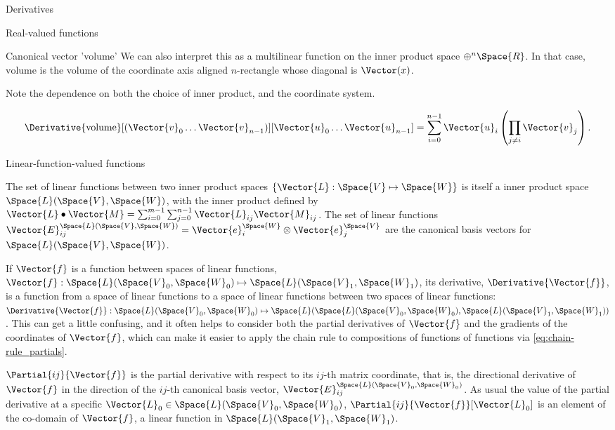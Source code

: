 \begin{plSection}{Derivatives}
\begin{plSection}{Real-valued functions}
\begin{plSection}{Canonical vector 'volume'}
We can also interpret this as a multilinear function on the
inner product space
$\oplus^{n} \Space{R}$.
In that case, $\text{volume}$ is the volume of the coordinate axis aligned
$n$-rectangle whose diagonal is $\Vector(x)$.

Note the dependence on both the choice of inner product, 
and the coordinate system.

\begin{equation}
\Derivative{\text{volume}}[(\Vector{v}_0 \ldots \Vector{v}_{n-1})][\Vector{u}_0 \ldots \Vector{u}_{n-1}]
 =  \sum_{i=0}^{n-1} \Vector{u}_i \left( \prod_{j \neq i} \Vector{v}_j \right).
\end{equation}

\end{plSection}%
\end{plSection}%
\begin{plSection}{Linear-function-valued functions}
\label{sec:Derivatives-of-linear-function-valued-functions}

The set of linear functions between two inner product spaces
$\left\{ \Vector{L} : \Space{V} \mapsto \Space{W} \right\}$
is itself a inner product space $\Space{L}(\Space{V},\Space{W})$,
with the inner product defined by
$\Vector{L} \bullet \Vector{M} = \sum_{i=0}^{m-1} \sum_{j=0}^{n-1} \Vector{L}_{ij} \Vector{M}_{ij}$.
The set of linear functions
$\Vector{E}_{ij}^{\Space{L}(\Space{V},\Space{W})}  = \Vector{e}_i^{\Space{W}} \otimes \Vector{e}_j^{\Space{V}}$
are the canonical basis vectors for $\Space{L}(\Space{V},\Space{W})$.

If $\Vector{f}$ is a function between spaces of linear functions,
$\Vector{f} : \Space{L}(\Space{V}_0,\Space{W}_0) \mapsto \Space{L}(\Space{V}_1,\Space{W}_1)$,
its derivative, $\Derivative{\Vector{f}}$,
is a function from a space of linear functions
to a space of linear functions between two
spaces of linear functions:
$\Derivative{\Vector{f}} : \Space{L}(\Space{V}_0,\Space{W}_0) \mapsto
\Space{L}(\Space{L}(\Space{V}_0,\Space{W}_0), \Space{L}(\Space{V}_1,\Space{W}_1))$.
This can get a little confusing,
and it often helps to consider both the partial derivatives of $\Vector{f}$
and the gradients of the coordinates of $\Vector{f}$,
which can make it easier to apply the chain rule to
compositions of functions of functions via \cref{eq:chain-rule_partials}.

$\Partial{ij}{\Vector{f}}$ is the partial derivative with respect to its $ij$-th matrix coordinate,
that is, the directional derivative of $\Vector{f}$ in the direction
of the $ij$-th canonical basis vector, $\Vector{E}_{ij}^{\Space{L}(\Space{V}_0,\Space{W}_0)}$.
As usual the value of the partial derivative at a specific
$\Vector{L}_0 \in  \Space{L}(\Space{V}_0,\Space{W}_0)$,
$\Partial{ij}{\Vector{f}}[\Vector{L}_0]$ 
is an element of the co-domain of $\Vector{f}$,
a linear function in  $\Space{L}(\Space{V}_1,\Space{W}_1)$.


\end{plSection}
\end{plSection}
